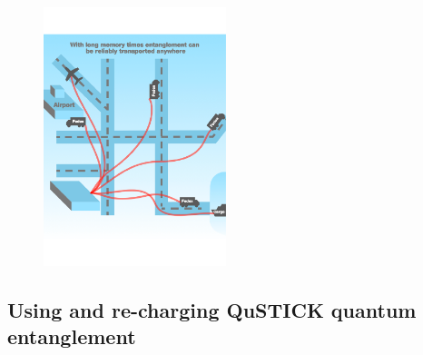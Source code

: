\documentclass[twocolumn, aps, rmp, amsmath, amssymb, nofootinbib, superscriptaddress, longbibliography, floatfix, table-of-contents, eqsecnum]{revtex4-2}
\begin{document}
\begin{figure}[htbp!]
	\includegraphics[clip=true, width=0.475\textwidth]{qustick3}
	\caption{} \label{fig:distribution}
\end{figure}

\subsection{Using and re-charging QuSTICK quantum entanglement}
\end{document}
